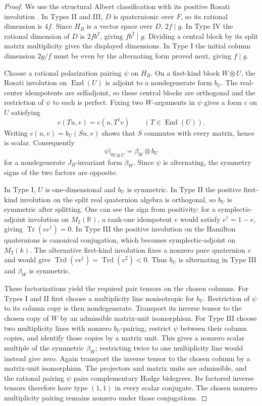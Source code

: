 \documentclass[11pt]{article}
\numberwithin{equation}{section}
\begin{document}
\begin{proof}
We use the structural Albert classification with its positive Rosati
involution \cite[Sections~10.13--10.14]{ChaiOortModuli}.  In Types II and
III, \(D\) is quaternionic over \(F\), so its rational dimension
is \(4f\).  Since \(H_B\) is a vector space over \(D\),
\(2f\mid g\).  In Type IV the rational dimension of \(D\) is
\(2fb^2\), giving \(fb^2\mid g\).  Dividing a central block by
its split matrix multiplicity gives the displayed dimensions.  In
Type I the initial column dimension \(2g/f\) must be even by the
alternating form proved next, giving \(f\mid g\).

Choose a rational polarization pairing \(\psi\) on \(H_B\).  On
a first-kind block \(W\otimes U\), the Rosati involution on
\(\operatorname{End}(U)\) is adjoint to a nondegenerate form \(b_U\).
The real-center idempotents are selfadjoint, so these central blocks
are orthogonal and the restriction of \(\psi\) to each is perfect.
Fixing two \(W\)-arguments in \(\psi\) gives a form \(c\) on \(U\)
satisfying
\[
 c(Tu,v)=c(u,T^\dagger v)\qquad(T\in\operatorname{End}(U)).
\]
Writing \(c(u,v)=b_U(Su,v)\) shows that \(S\) commutes with every
matrix, hence is scalar.  Consequently
\[
 \psi|_{W\otimes U}=\beta_W\otimes b_U
\]
for a nondegenerate \(J_B\)-invariant form \(\beta_W\).  Since
\(\psi\) is alternating, the symmetry signs of the two factors are
opposite.

In Type I, \(U\) is one-dimensional and \(b_U\) is symmetric.
In Type II the positive first-kind involution on the split real
quaternion algebra is orthogonal, so \(b_U\) is symmetric after
splitting.  One can see the sign from positivity: for a
symplectic-adjoint involution on \(M_2(\mathbb R)\), a rank-one idempotent
\(e\) would satisfy \(e^\dagger=1-e\), giving
\(\operatorname{Tr}(ee^\dagger)=0\).  In Type III the positive
involution on the Hamilton quaternions is canonical conjugation,
which becomes symplectic-adjoint on \(M_2(k)\).  The alternative
first-kind involution fixes a nonzero pure quaternion \(v\) and
would give \(\operatorname{Trd}(vv^\dagger)=\operatorname{Trd}(v^2)<0\).
Thus \(b_U\) is alternating in Type III and \(\beta_W\) is
symmetric.

These factorizations yield the required pair tensors on the chosen
columns.  For Types I and II first choose a multiplicity line
nonisotropic for \(b_U\).  Restriction of \(\psi\) to its column
copy is then nondegenerate.  Transport its inverse tensor to the
chosen copy of \(W\) by an admissible matrix-unit isomorphism.
For Type III choose two multiplicity lines with
nonzero \(b_U\)-pairing, restrict \(\psi\) between their column
copies, and identify those copies by a matrix unit.  This gives a
nonzero scalar multiple of the symmetric \(\beta_W\); restricting
twice to one multiplicity line would instead give zero.  Again
transport the inverse tensor to the chosen column by a matrix-unit
isomorphism.  The
projectors and matrix units are admissible, and the rational
pairing \(\psi\) pairs complementary Hodge bidegrees.  Its
factored inverse tensors therefore have type \((1,1)\) in every
scalar conjugate.  The chosen nonzero multiplicity pairing remains
nonzero under those conjugations.


\end{proof}
\end{document}
